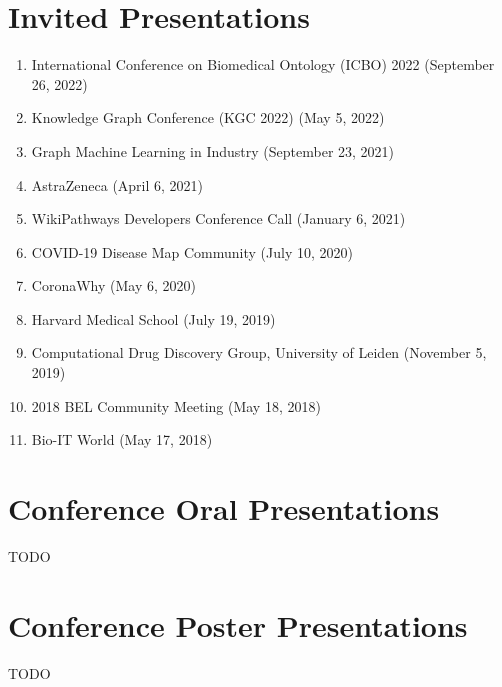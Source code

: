 \documentclass[10pt,a4paper,sans]{moderncv} %
\begin{document}
\section{Invited Presentations}
\begin{enumerate}
        \item International Conference on Biomedical Ontology (ICBO) 2022 (September 26, 2022)
        \item Knowledge Graph Conference (KGC 2022) (May 5, 2022)
        \item Graph Machine Learning in Industry (September 23, 2021)
        \item AstraZeneca (April 6, 2021)
        \item WikiPathways Developers Conference Call (January 6, 2021)
        \item COVID-19 Disease Map Community (July 10, 2020)
        \item CoronaWhy (May 6, 2020)
        \item Harvard Medical School (July 19, 2019)
        \item Computational Drug Discovery Group, University of Leiden (November 5, 2019)
        \item 2018 BEL Community Meeting (May 18, 2018)
        \item Bio-IT World (May 17, 2018)
\end{enumerate}

\section{Conference Oral Presentations}

TODO

\section{Conference Poster Presentations}

TODO
\end{document}
